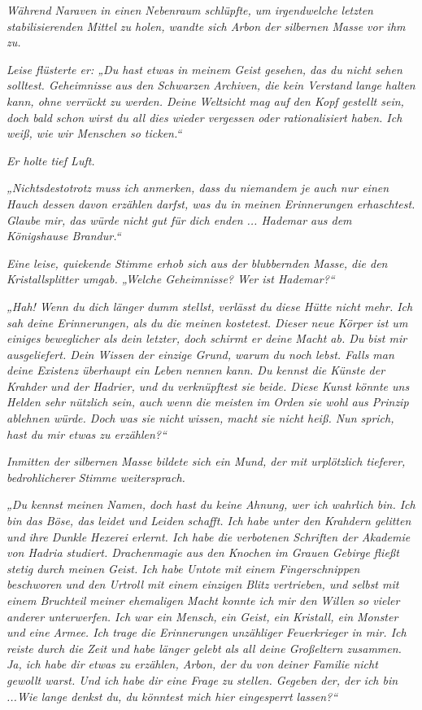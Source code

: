 \textit{Während Naraven in einen Nebenraum schlüpfte, um irgendwelche letzten stabilisierenden Mittel zu holen, wandte sich Arbon der silbernen Masse vor ihm zu.}

\textit{Leise flüsterte er: „Du hast etwas in meinem Geist gesehen, das du nicht sehen solltest. Geheimnisse aus den Schwarzen Archiven, die kein Verstand lange halten kann, ohne verrückt zu werden. Deine Weltsicht mag auf den Kopf gestellt sein, doch bald schon wirst du all dies wieder vergessen oder rationalisiert haben. Ich weiß, wie wir Menschen so ticken.“}

\textit{Er holte tief Luft.}

\textit{„Nichtsdestotrotz muss ich anmerken, dass du niemandem je auch nur einen Hauch dessen davon erzählen darfst, was du in meinen Erinnerungen erhaschtest. Glaube mir, das würde nicht gut für dich enden ... Hademar aus dem Königshause Brandur.“}

\textit{Eine leise, quiekende Stimme erhob sich aus der blubbernden Masse, die den Kristallsplitter umgab. „Welche Geheimnisse? Wer ist Hademar?“}

\textit{„Hah! Wenn du dich länger dumm stellst, verlässt du diese Hütte nicht mehr. Ich sah deine Erinnerungen, als du die meinen kostetest. Dieser neue Körper ist um einiges beweglicher als dein letzter, doch schirmt er deine Macht ab. Du bist mir ausgeliefert. Dein Wissen der einzige Grund, warum du noch lebst. Falls man deine Existenz überhaupt ein Leben nennen kann. Du kennst die Künste der Krahder und der Hadrier, und du verknüpftest sie beide. Diese Kunst könnte uns Helden sehr nützlich sein, auch wenn die meisten im Orden sie wohl aus Prinzip ablehnen würde. Doch was sie nicht wissen, macht sie nicht heiß. Nun sprich, hast du mir etwas zu erzählen?“}

\textit{Inmitten der silbernen Masse bildete sich ein Mund, der mit urplötzlich tieferer, bedrohlicherer Stimme weitersprach.}

\textit{„Du kennst meinen Namen, doch hast du keine Ahnung, wer ich wahrlich bin. Ich bin das Böse, das leidet und Leiden schafft. Ich habe unter den Krahdern gelitten und ihre Dunkle Hexerei erlernt. Ich habe die verbotenen Schriften der Akademie von Hadria studiert. Drachenmagie aus den Knochen im Grauen Gebirge fließt stetig durch meinen Geist. Ich habe Untote mit einem Fingerschnippen beschworen und den Urtroll mit einem einzigen Blitz vertrieben, und selbst mit einem Bruchteil meiner ehemaligen Macht konnte ich mir den Willen so vieler anderer unterwerfen. Ich war ein Mensch, ein Geist, ein Kristall, ein Monster und eine Armee. Ich trage die Erinnerungen unzähliger Feuerkrieger in mir. Ich reiste durch die Zeit und habe länger gelebt als all deine Großeltern zusammen. Ja, ich habe dir etwas zu erzählen, Arbon, der du von deiner Familie nicht gewollt warst. Und ich habe dir eine Frage zu stellen. Gegeben der, der ich bin ...Wie lange denkst du, du könntest mich hier eingesperrt lassen?“}

